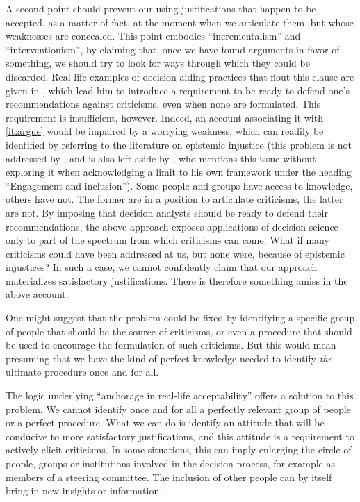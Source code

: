 \documentclass[preprint, french, english, 11pt, authoryear]{elsarticle}%
\begin{document}
A second point should prevent our using justifications that happen to be accepted, as a matter of fact, at the moment when we articulate them, but whose weaknesses are concealed. 
This point embodies “incrementalism” and ``interventionism'', by claiming that, once we have found arguments in favor of something, we should try to look for ways through which they could be discarded. 
Real-life examples of decision-aiding practices that flout this clause are given in \cite{meinard_what_2017}, which lead him to introduce a requirement to be ready to defend one's recommendations against criticisms, even when none are formulated. 
This requirement is insufficient, however. Indeed, an account associating it with \cref{it:argue} would be impaired by a worrying weakness, which can readily be identified by referring to the literature on epistemic injustice \citep{fricker_epistemic_2007} 
(this problem is not addressed by \cite{meinard_what_2017}, and is also left aside by \cite{mingers_ethics_2011}, who mentions this issue without exploring it when acknowledging a limit to his own framework under the heading ``Engagement and inclusion''). 
Some people and groups have access to knowledge, others have not. The former are in a position to articulate criticisms, the latter are not. 
By imposing that decision analysts should be ready to defend their recommendations, the above approach exposes applications of decision science only to part of the spectrum from which criticisms can come. 
What if many criticisms could have been addressed at us, but none were, because of epistemic injustices? In such a case, we cannot confidently claim that our approach materializes satisfactory justifications. There is therefore something amiss in the above account.

One might suggest that the problem could be fixed by identifying a specific group of people that should be the source of criticisms, or even a procedure that should be used to encourage the formulation of such criticisms. 
But this would mean presuming that we have the kind of perfect knowledge needed to identify \emph{the} ultimate procedure once and for all.

The logic underlying ``anchorage in real-life acceptability” offers a solution to this problem. We cannot identify once and for all a perfectly relevant group of people or a perfect procedure. 
What we can do is identify an attitude that will be conducive to more satisfactory justifications, and this attitude is a requirement to actively elicit criticisms.
In some situations, this can imply enlarging the circle of people, groups or institutions involved in the decision process, for example as members of a steering committee.
The inclusion of other people can by itself bring in new insights or information.
  
\end{document}
